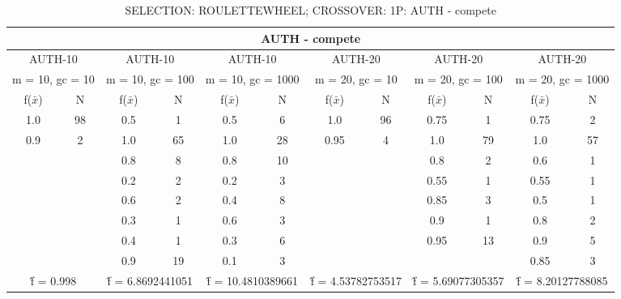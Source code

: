 \begin{table}[H]
	\centering
	\caption{SELECTION: ROULETTEWHEEL; CROSSOVER: 1P: AUTH - compete}
	\begin{adjustbox}{width=1\textwidth}
		\begin{tabular}{ |c|c||c|c||c|c||c|c||c|c||c|c| }
			\hline
			\multicolumn{12}{|c|}{AUTH - compete} \\
			\hline
			\multicolumn{2}{|c||}{AUTH-10} & \multicolumn{2}{c||}{AUTH-10} & \multicolumn{2}{c||}{AUTH-10} & \multicolumn{2}{c||}{AUTH-20} & \multicolumn{2}{c||}{AUTH-20} & \multicolumn{2}{c|}{AUTH-20}\\
			\hline
			\multicolumn{2}{|c||}{m = 10, gc = 10} & \multicolumn{2}{c||}{m = 10, gc = 100} & \multicolumn{2}{c||}{m = 10, gc = 1000} & \multicolumn{2}{c||}{m = 20, gc = 10} & \multicolumn{2}{c||}{m = 20, gc = 100} & \multicolumn{2}{c|}{m = 20, gc = 1000}\\
			\hline
			f($\bar{x}$) & N & f($\bar{x}$) & N & f($\bar{x}$) & N & f($\bar{x}$) & N & f($\bar{x}$) & N & f($\bar{x}$) & N\\
			\hline
			\hline
			1.0 & 98 & 0.5 & 1 & 0.5 & 6 & 1.0 & 96 & 0.75 & 1 & 0.75 & 2\\
			0.9 & 2 & 1.0 & 65 & 1.0 & 28 & 0.95 & 4 & 1.0 & 79 & 1.0 & 57\\
			&   & 0.8 & 8 & 0.8 & 10 &   &   & 0.8 & 2 & 0.6 & 1\\
			&   & 0.2 & 2 & 0.2 & 3 &   &   & 0.55 & 1 & 0.55 & 1\\
			&   & 0.6 & 2 & 0.4 & 8 &   &   & 0.85 & 3 & 0.5 & 1\\
			&   & 0.3 & 1 & 0.6 & 3 &   &   & 0.9 & 1 & 0.8 & 2\\
			&   & 0.4 & 1 & 0.3 & 6 &   &   & 0.95 & 13 & 0.9 & 5\\
			&   & 0.9 & 19 & 0.1 & 3 &   &   &   &   & 0.85 & 3\\
			\hline
			\multicolumn{2}{|c||}{\^{f} = 0.998} & \multicolumn{2}{c||}{\^{f} = 6.8692441051} & \multicolumn{2}{c||}{\^{f} = 10.4810389661} & \multicolumn{2}{c||}{\^{f} = 4.53782753517} & \multicolumn{2}{c||}{\^{f} = 5.69077305357} & \multicolumn{2}{c|}{\^{f} = 8.20127788085}\\
			\hline
		\end{tabular}
	\end{adjustbox}
\end{table}
